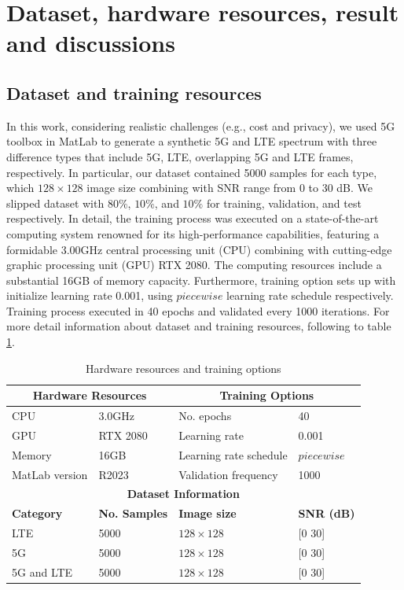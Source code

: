 \documentclass[journal]{IEEEtran} %
\begin{document}
\section{Dataset, hardware resources, result and discussions}

\subsection{Dataset and training resources}
In this work, considering realistic challenges (e.g., cost and privacy), we used 5G toolbox in MatLab to generate a synthetic 5G and LTE spectrum with three difference types that include 5G, LTE, overlapping 5G and LTE frames, respectively. In particular, our dataset contained 5000 samples for each type, which \(128 \times 128\) image size combining with SNR range from 0 to 30 dB. We slipped dataset with \(80\%\), \(10\%\), and \(10\%\) for training, validation, and test respectively. In detail, the training process was executed on a state-of-the-art computing system renowned for its high-performance capabilities, featuring a formidable 3.00GHz central processing unit (CPU) combining with cutting-edge graphic processing unit (GPU) RTX 2080. The computing resources include a substantial 16GB of memory capacity. Furthermore, training option sets up with initialize learning rate 0.001, using \(piecewise\) learning rate schedule respectively. Training process executed in 40 epochs and validated every 1000 iterations. For more detail information about dataset and training resources, following to table \ref{tab2}.

\begin{table}[htbp]
\centering
\caption{Hardware resources and training options}
\label{tab2}
\begin{tabular}{|l|l|l|l|}
\hline
\multicolumn{2}{|c|}{\textbf{Hardware Resources}} & \multicolumn{2}{c|}{\textbf{Training Options}} \\ \hline
CPU & 3.0GHz & No. epochs & 40 \\ 
GPU & RTX 2080 & Learning rate & 0.001 \\
Memory & 16GB & Learning rate schedule & \(piecewise\) \\ 
MatLab version & R2023 & Validation frequency & 1000 \\
\hline
\multicolumn{4}{|c|}{\textbf{Dataset Information}} \\
\hline
\textbf{Category} & \textbf{No. Samples} & \textbf{Image size} & \textbf{SNR (dB)}\\
\hline
LTE & 5000 & \(128 \times 128\) & [0 30] \\
5G & 5000 & \(128 \times 128\) & [0 30]\\
5G and LTE & 5000 & \(128 \times 128\)& [0 30]  \\
\hline
\end{tabular}
\end{table}
\end{document}
